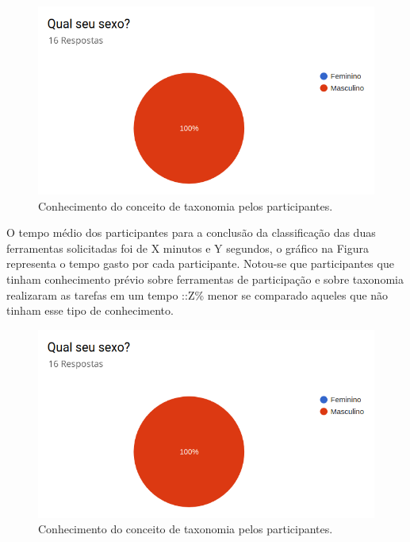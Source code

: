 \begin{figure}[!ht]
    \centering
    \includegraphics[scale=0.3]{./figuras/grafico_placeholder.png}
    \caption{Conhecimento do conceito de taxonomia pelos participantes.}
    \label{fig:grafico-conhe-taxonomia}
\end{figure}

\par
O tempo médio dos participantes para a conclusão da classificação das duas ferramentas solicitadas foi de X minutos e Y segundos, o gráfico na Figura \label{fig:grafico-tempo}
representa o tempo gasto por cada participante. Notou-se que participantes que tinham conhecimento prévio sobre ferramentas de participação e sobre taxonomia realizaram 
as tarefas em um tempo ::Z\% menor se comparado aqueles que não tinham esse tipo de conhecimento.

\begin{figure}[!ht]
    \centering
    \includegraphics[scale=0.3]{./figuras/grafico_placeholder.png}
    \caption{Conhecimento do conceito de taxonomia pelos participantes.}
    \label{fig:grafico-tempo}
\end{figure}

